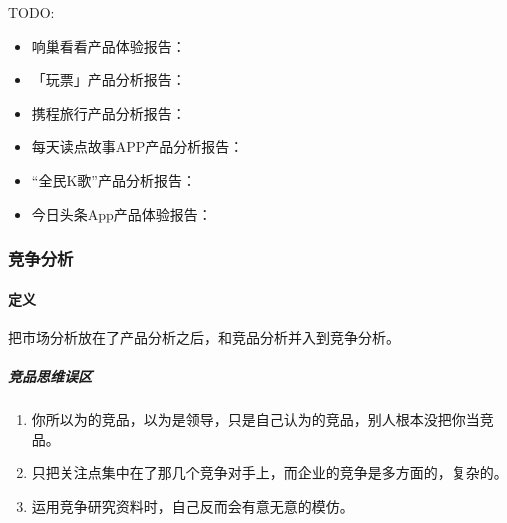 \documentclass[letterpaper,10pt,english]{sphinxmanual}
\begin{document}
TODO:
\begin{itemize}
\item {} 
响巢看看产品体验报告：

\item {} 
「玩票」产品分析报告： 

\item {} 
携程旅行产品分析报告：

\item {} 
每天读点故事APP产品分析报告：

\item {} 
“全民K歌”产品分析报告：

\item {} 
今日头条App产品体验报告：

\end{itemize}


\subsubsection{竞争分析}
\label{\detokenize{chapter_knowledge/compete_analysis:id1}}\label{\detokenize{chapter_knowledge/compete_analysis::doc}}

\paragraph{定义}
\label{\detokenize{chapter_knowledge/compete_analysis:id2}}
把市场分析放在了产品分析之后，和竞品分析并入到竞争分析。


\subparagraph{竞品思维误区}
\label{\detokenize{chapter_knowledge/compete_analysis:id3}}\begin{enumerate}
%
\item {} 
你所以为的竞品，以为是领导，只是自己认为的竞品，别人根本没把你当竞品。

\item {} 
只把关注点集中在了那几个竞争对手上，而企业的竞争是多方面的，复杂的。

\item {} 
运用竞争研究资料时，自己反而会有意无意的模仿。

\end{enumerate}
\end{document}
